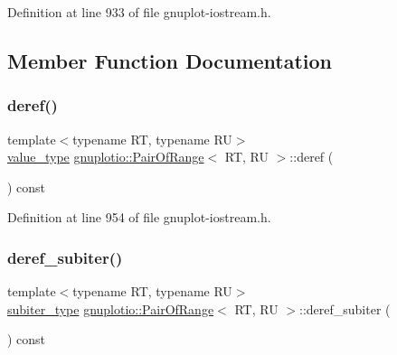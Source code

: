 Definition at line 933 of file gnuplot-\/iostream.\+h.



\subsection{Member Function Documentation}
\mbox{\label{classgnuplotio_1_1_pair_of_range_af4ed81400c73c45c9aa1e6d0ad14579f}} 
\subsubsection{\texorpdfstring{deref()}{deref()}}
{\footnotesize\ttfamily template$<$typename RT, typename RU$>$ \\
\hyperlink{classgnuplotio_1_1_pair_of_range_a0cc8b0cc4d9c3377c43843ed9a658eeb}{value\+\_\+type} \hyperlink{classgnuplotio_1_1_pair_of_range}{gnuplotio\+::\+Pair\+Of\+Range}$<$ RT, RU $>$\+::deref (\begin{DoxyParamCaption}{ }\end{DoxyParamCaption}) const\hspace{0.3cm}{\ttfamily [inline]}}



Definition at line 954 of file gnuplot-\/iostream.\+h.

\mbox{\label{classgnuplotio_1_1_pair_of_range_aaab5fb2c7de99651a2c7eef7685545fd}} 
\subsubsection{\texorpdfstring{deref\+\_\+subiter()}{deref\_subiter()}}
{\footnotesize\ttfamily template$<$typename RT, typename RU$>$ \\
\hyperlink{classgnuplotio_1_1_pair_of_range_a6a7bf8a5dd4ca0563eb71b1156d6cd9f}{subiter\+\_\+type} \hyperlink{classgnuplotio_1_1_pair_of_range}{gnuplotio\+::\+Pair\+Of\+Range}$<$ RT, RU $>$\+::deref\+\_\+subiter (\begin{DoxyParamCaption}{ }\end{DoxyParamCaption}) const\hspace{0.3cm}{\ttfamily [inline]}}



